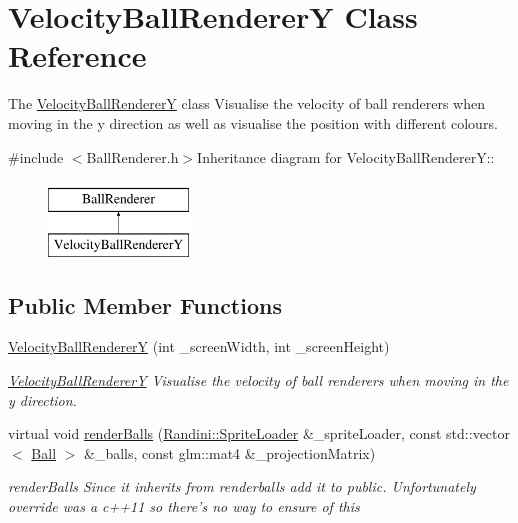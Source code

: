 \hypertarget{classVelocityBallRendererY}{
\section{VelocityBallRendererY Class Reference}
\label{classVelocityBallRendererY}
}


The \hyperlink{classVelocityBallRendererY}{VelocityBallRendererY} class Visualise the velocity of ball renderers when moving in the y direction as well as visualise the position with different colours.  


{\ttfamily \#include $<$BallRenderer.h$>$}Inheritance diagram for VelocityBallRendererY::\begin{figure}[H]
\begin{center}
\leavevmode
\includegraphics[height=2cm]{classVelocityBallRendererY}
\end{center}
\end{figure}
\subsection*{Public Member Functions}
\begin{DoxyCompactItemize}
\item 
\hyperlink{classVelocityBallRendererY_a7eb5545ad69050dd7bd06f014d1ecb85}{VelocityBallRendererY} (int \_\-screenWidth, int \_\-screenHeight)
\begin{DoxyCompactList}\small\item\em \hyperlink{classVelocityBallRendererY}{VelocityBallRendererY} Visualise the velocity of ball renderers when moving in the y direction. \item\end{DoxyCompactList}\item 
virtual void \hyperlink{classVelocityBallRendererY_ac519caa863fba74226b6733dbe033b59}{renderBalls} (\hyperlink{classRandini_1_1SpriteLoader}{Randini::SpriteLoader} \&\_\-spriteLoader, const std::vector$<$ \hyperlink{structBall}{Ball} $>$ \&\_\-balls, const glm::mat4 \&\_\-projectionMatrix)
\begin{DoxyCompactList}\small\item\em renderBalls Since it inherits from renderballs add it to public. Unfortunately override was a c++11 so there's no way to ensure of this \item\end{DoxyCompactList}\end{DoxyCompactItemize}


